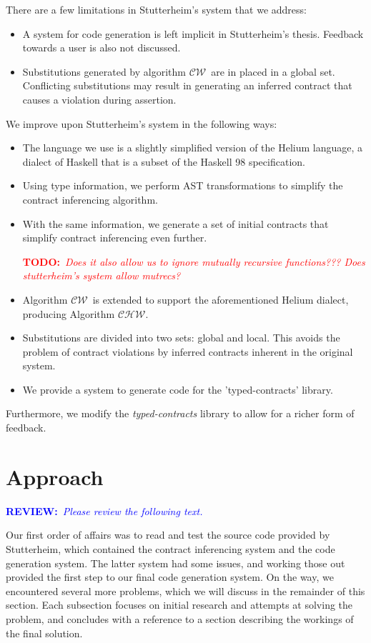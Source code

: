 \documentclass[10pt]{report}
\newcommand{\CW}{$\mathcal{CW}$}
\newcommand{\CHW}{$\mathcal{CHW}$}
\newcommand{\annotate}[3]{
	\begin{scriptsize}
	\textcolor{#1}{\textbf{#2}~\textit{#3}}
	\end{scriptsize}\newline}
\newcommand{\todo}[1]{\annotate{red} {TODO:} {#1}}
\newcommand{\review}{\annotate{blue} {REVIEW:} {Please review the following text. \newline}}
\begin{document}
There are a few limitations in Stutterheim's system that we address:

\begin{itemize}
	\item A system for code generation is left implicit in Stutterheim's thesis. Feedback towards a user is also not discussed.
	\item Substitutions generated by algorithm \CW ~are in placed in a global set. Conflicting substitutions may result in generating an inferred contract that causes a violation during assertion.
\end{itemize}

We improve upon Stutterheim's system in the following ways:
\begin{itemize}
	\item The language we use is a slightly simplified version of the Helium language, a dialect of Haskell that is a subset of the Haskell 98 specification.
	\item Using type information, we perform AST transformations to simplify the contract inferencing algorithm.
	\item With the same information, we generate a set of initial contracts that simplify contract inferencing even further. \todo{Does it also allow us to ignore mutually recursive functions??? Does stutterheim's system allow mutrecs?}
	\item Algorithm \CW ~is extended to support the aforementioned Helium dialect, producing Algorithm \CHW.
	\item Substitutions are divided into two sets: global and local. This avoids the problem of contract violations by inferred contracts inherent in the original system.
	\item We provide a system to generate code for the 'typed-contracts' library.
\end{itemize}

Furthermore, we modify the \textit{typed-contracts} library to allow for a richer form of feedback.



\chapter{Approach}

\review

Our first order of affairs was to read and test the source code provided by Stutterheim, which contained the contract inferencing system and the code generation system.
The latter system had some issues, and working those out provided the first step to our final code generation system.
On the way, we encountered several more problems, which we will discuss in the remainder of this section.
Each subsection focuses on initial research and attempts at solving the problem, and concludes with a reference to a section describing the workings of the final solution.
\end{document}
